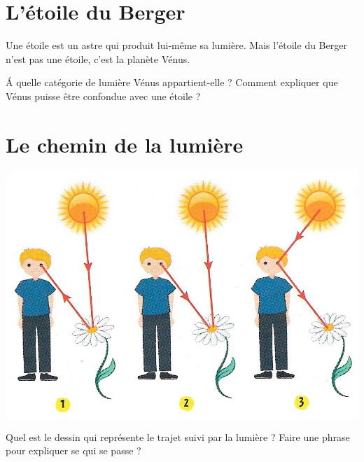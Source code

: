 \documentclass[a4paper,11pt]{exam}
\begin{document}
\vspace*{-0.5cm}

\section{L'étoile du Berger}

Une étoile est un astre qui produit lui-même sa lumière. Mais l'étoile du Berger n'est pas une étoile, c'est la planète Vénus.

\begin{questions}
	\question \'A quelle catégorie de lumière Vénus appartient-elle ?
	\question Comment expliquer que Vénus puisse être confondue avec une étoile ?
\end{questions}

\vspace*{-0.5cm}
\section{Le chemin de la lumière}

\begin{multicols}{2}
	
	\includegraphics[scale=0.25]{exo_trajet_lumiere}
	
	\begin{questions}
		\question Quel est le dessin qui représente le trajet suivi par la lumière ?
		\question Faire une phrase pour expliquer se qui se passe ?
	\end{questions}	
\end{multicols}

\ \label{LastPage}
\end{document}
